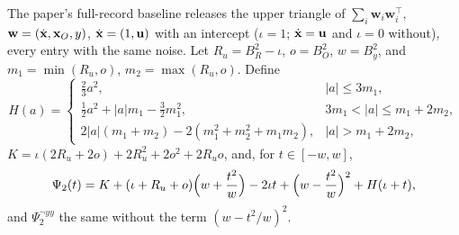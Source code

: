 The paper's full-record baseline releases the upper triangle of $\sum_i\mathbf w_i\mathbf w_i^\top$, $\mathbf w=(\dot{\mathbf{x}},\mathbf{x}_O,y)$, $\dot{\mathbf{x}}=(1,\mathbf u)$ with an intercept ($\iota=1$; $\dot{\mathbf{x}}=\mathbf u$ and $\iota=0$ without), every entry with the same noise. Let $R_u=B_R^2-\iota$, $o=B_O^2$, $w=B_y^2$, and $m_1=\min(R_u,o)$, $m_2=\max(R_u,o)$. Define
\[
  H(a)=\begin{cases}\tfrac23a^2,&|a|\le3m_1,\\ \tfrac12a^2+|a|m_1-\tfrac32m_1^2,&3m_1<|a|\le m_1+2m_2,\\ 2|a|(m_1+m_2)-2(m_1^2+m_2^2+m_1m_2),&|a|>m_1+2m_2,\end{cases}
\]
$K=\iota(2R_u+2o)+2R_u^2+2o^2+2R_uo$, and, for $t\in[-w,w]$,
\[
  \Psi_2(t)=K+(\iota+R_u+o)\Bigl(w+\frac{t^2}w\Bigr)-2\iota t+\Bigl(w-\frac{t^2}w\Bigr)^2+H(\iota+t),
\]
and $\Psi_2^{\neg yy}$ the same without the term $(w-t^2/w)^2$.

